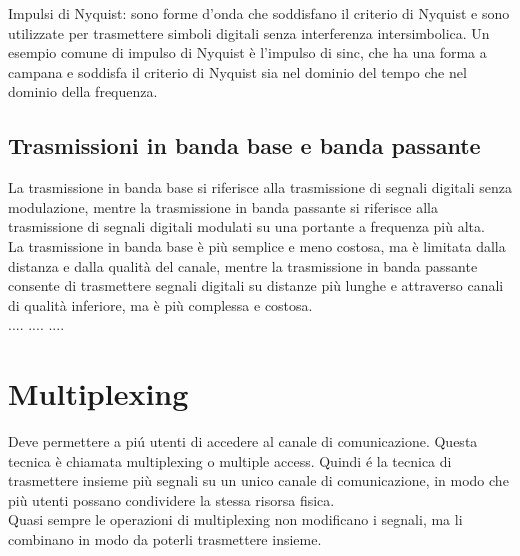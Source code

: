 Impulsi di Nyquist: sono forme d'onda che soddisfano il criterio di Nyquist e
 sono utilizzate per trasmettere simboli digitali senza interferenza intersimbolica. 
 Un esempio comune di impulso di Nyquist è l'impulso di sinc, che ha una forma a 
 campana e soddisfa il criterio di Nyquist sia nel dominio del tempo che nel dominio 
 della frequenza.\\

\subsection{Trasmissioni in banda base e banda passante}
La trasmissione in banda base si riferisce alla trasmissione di segnali digitali senza
modulazione, mentre la trasmissione in banda passante si riferisce alla trasmissione di
segnali digitali modulati su una portante a frequenza più alta.\\
La trasmissione in banda base è più semplice e meno costosa, ma è limitata dalla
distanza e dalla qualità del canale, mentre la trasmissione in banda passante 
consente di trasmettere segnali digitali su distanze più lunghe e attraverso canali 
di qualità inferiore, ma è più complessa e costosa.\\
....
....
....
\section{Multiplexing}
Deve permettere a piú utenti di accedere al canale di comunicazione. Questa 
tecnica è chiamata multiplexing o multiple access. Quindi é la tecnica di 
trasmettere insieme più segnali su un unico canale di comunicazione, in modo
che più utenti possano condividere la stessa risorsa fisica.\\

Quasi sempre le operazioni di multiplexing non modificano i segnali, ma li
combinano in modo da poterli trasmettere insieme.\\

